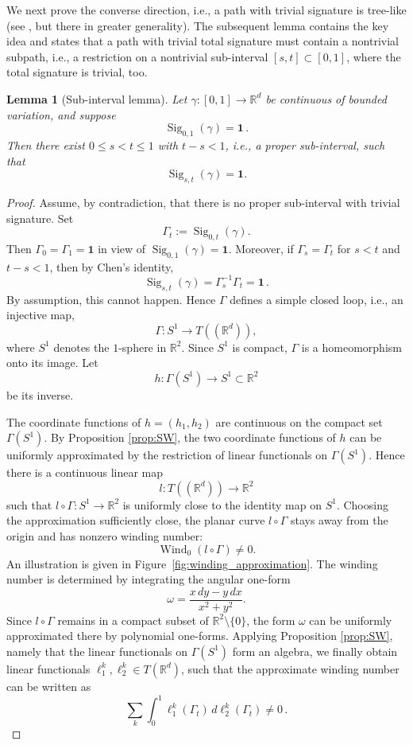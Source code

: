 \documentclass[11pt]{article}
\newtheorem{lemma}[theorem]{Lemma}
\theoremstyle{definition}
\newcommand{\R}{\mathbb{R}}
\newcommand{\Sig}{\operatorname{Sig}}
\newcommand{\id}{\mathbf{1}}
\newcommand{\wind}{\operatorname{Wind}}
\begin{document}
We next prove the converse direction, i.e., a path with trivial signature is tree-like (see \cite{BGLY2016}, but there in greater generality). The subsequent lemma contains the key idea and states that a path with trivial total signature must contain a nontrivial subpath, i.e., a restriction on a nontrivial sub-interval $[s,t] \subset [0,1]$, where the total signature is trivial, too.

\begin{lemma}[Sub-interval lemma]\label{lem:subinterval}
Let $\gamma:[0,1]\to\R^d$ be continuous of bounded variation, and suppose
\[
  \Sig_{0,1}(\gamma)=\id \, .
\]
Then there exist \(0\leq s<t\leq 1\) with $ t-s < 1$, i.e., a proper sub-interval, such that
\[
  \Sig_{s,t}(\gamma)=\id.
\]
\end{lemma}

\begin{proof}
Assume, by contradiction, that there is no proper sub-interval with trivial signature. Set
\[
  \Gamma_t:=\Sig_{0,t}(\gamma).
\]
Then $\Gamma_0=\Gamma_1 = \id $ in view of  $ \Sig_{0,1}(\gamma)=\id $. Moreover, if $\Gamma_s=\Gamma_t$ for $ s < t$ and $t-s <1$, then by  Chen's identity,
\[
  \Sig_{s,t}(\gamma)=\Gamma_s^{-1}\Gamma_t= \id \, .
\]
By assumption, this cannot happen. Hence $\Gamma$ defines a simple closed loop, i.e., an injective map,
\[
  \Gamma:S^1\to T((\R^d)), 
\]
where $S^1 $ denotes the $1$-sphere in $\R^2$. Since $S^1$ is compact, $\Gamma$ is a homeomorphism onto its image. Let
\[
  h:\Gamma(S^1)\to S^1\subset\R^2
\]
be its inverse.

The coordinate functions of $h=(h_1,h_2)$ are continuous on the compact set $\Gamma(S^1)$. By Proposition \ref{prop:SW}, the two coordinate functions of $h$ can be uniformly approximated 
by the restriction of linear functionals on $\Gamma(S^1)$. Hence there is a continuous linear map
\[
  l:T((\R^d))\to\R^2
\]
such that $l\circ \Gamma: S^1\to \R^2$ 
is uniformly close to the identity map on $S^1$. Choosing the approximation sufficiently close, the planar curve $ l \circ \Gamma $ stays away from the origin and has nonzero winding number:
\[
  \wind_0( l \circ\Gamma)\neq 0.
\]
An illustration is given in Figure~\ref{fig:winding_approximation}. 
The winding number is determined by integrating the angular one-form 
\[
  \omega=\frac{x\,dy-y\,dx}{x^2+y^2}.
\]
Since $ l \circ \Gamma $ remains in a compact subset of $\mathbb{R}^2\setminus\{0\}$, the form $\omega$ can be uniformly approximated there by polynomial one-forms. Applying Proposition \ref{prop:SW}, namely that the linear functionals on $\Gamma(S^1)$ form an algebra, we finally obtain linear functionals $\ell_1^k, \ell_2^k \in T(\mathbb{R}^d)$, such that the approximate winding number can be written as
\[
\sum_k  \int_0^1 \ell_1^k(\Gamma_t) \, d \ell_2^k(\Gamma_t) \neq 0 \, .
\]



\end{proof}
\end{document}

